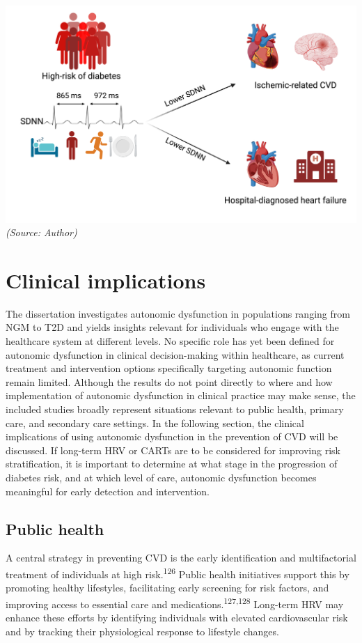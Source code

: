 \documentclass[
  a4paper,
  headsepline=true,
  open=any]{scrbook}
\begin{document}
\includegraphics{images/ADD_PRO_IMG.png} \emph{(Source: Author)}

\hypertarget{clinical-implications}{%
\section{Clinical implications}\label{clinical-implications}}

The dissertation investigates autonomic dysfunction in populations
ranging from NGM to T2D and yields insights relevant for individuals who
engage with the healthcare system at different levels. No specific role
has yet been defined for autonomic dysfunction in clinical
decision-making within healthcare, as current treatment and intervention
options specifically targeting autonomic function remain limited.
Although the results do not point directly to where and how
implementation of autonomic dysfunction in clinical practice may make
sense, the included studies broadly represent situations relevant to
public health, primary care, and secondary care settings. In the
following section, the clinical implications of using autonomic
dysfunction in the prevention of CVD will be discussed. If long-term HRV
or CARTs are to be considered for improving risk stratification, it is
important to determine at what stage in the progression of diabetes
risk, and at which level of care, autonomic dysfunction becomes
meaningful for early detection and intervention.

\hypertarget{public-health}{%
\subsection{Public health}\label{public-health}}

A central strategy in preventing CVD is the early identification and
multifactorial treatment of individuals at high
risk.\textsuperscript{126} Public health initiatives support this by
promoting healthy lifestyles, facilitating early screening for risk
factors, and improving access to essential care and
medications.\textsuperscript{127,128} Long-term HRV may enhance these
efforts by identifying individuals with elevated cardiovascular risk and
by tracking their physiological response to lifestyle changes.
\end{document}
